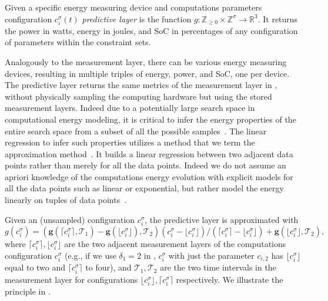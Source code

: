\begin{defn}
  \label{def:comp-ener}
  Given a specific energy measuring device and computations parameters configuration $c_i^\sigma(t)$ \textit{predictive layer} is the function $g:\mathbb{Z}_{\geq 0}\times\mathbb{Z}^\sigma\rightarrow\mathbb{R}^3$. It returns the power in watts, energy in joules, and SoC in percentages of any configuration of parameters within the constraint sets.
\end{defn}

Analogously to the measurement layer, there can be various energy measuring devices, resulting in multiple triples of energy, power, and SoC, one per device. The predictive layer returns the same metrics of the measurement layer in , without physically sampling the computing hardware but using the stored measurement layers. Indeed due to a potentially large search space in computational energy modeling, it is critical to infer the energy properties of the entire search space from a subset of all the possible samples~\citep{lee2006statistically,lee2006accurate,bailey2014adaptive}. The linear regression to infer such properties utilizes a method that we term the approximation method~\citep{seewald2019coarse}. It builds a linear regression between two adjacent data points rather than merely for all the data points. Indeed we do not assume an apriori knowledge of the computations energy evolution with explicit models for all the data points such as linear or exponential, but rather model the energy linearly on tuples of data points~\citep{seewald2019coarse}.

Given an (unsampled) configuration $c_i^\sigma$, the predictive layer is approximated with
\begin{equation}
  g(c_i^\sigma)=(\mathbf{g}(\lceil c_i^\sigma\rceil,\mathcal{T}_1)-\mathbf{g}(\lfloor c_i^\sigma\rfloor),\mathcal{T}_2)(c_i^\sigma-\lfloor c_i^\sigma\rfloor)/(\lceil c_i^\sigma\rceil-\lfloor c_i^\sigma\rfloor)+\mathbf{g}(\lfloor c_i^\sigma\rfloor,\mathcal{T}_2),
\end{equation}
where $\lceil c_i^\sigma\rceil,\lfloor c_i^\sigma\rfloor$ are the two adjacent measurement layers of the computations configuration $c_i^\sigma$ (e.g., if we use $\delta_1=2$ in , $c_i^\sigma$ with just the parameter $c_{i,2}$ has $\lfloor c_i^\sigma\rfloor$ equal to two and $\lceil c_i^\sigma\rceil$ to four), and $\mathcal{T}_1,\mathcal{T}_2$ are the two time intervals in the measurement layer for configurations $\lfloor c_i^\sigma\rfloor,\lceil c_i^\sigma\rceil$ respectively.
We illustrate the principle in . %

